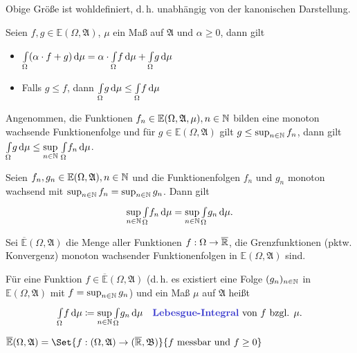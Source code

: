 \documentclass{cheat-sheet}
\newcommand{\Alg}{\mathfrak{A}} %
\newcommand{\Bor}{\mathfrak{B}} %
\newcommand{\E}{\mathbb{E}} %
\theoremstyle{definition}
\newcommand{\IntOmu}[1]{\Int{\Omega}{}{#1}{\mu}} %
\begin{document}
\begin{bem}
  Obige Größe ist wohldefiniert, d.\,h. unabhängig von der kanonischen Darstellung.
\end{bem}

\begin{satz}
  Seien $f, g \in \E(\Omega, \Alg)$, $\mu$ ein Maß auf $\Alg$ und $\alpha \geq 0$, dann gilt
  \begin{itemize}
    \item $\IntOmu{(\alpha \cdot f + g)} = \alpha \cdot \IntOmu{f} + \IntOmu{g}$ 
    \item Falls $g \leq f$, dann $\IntOmu{g} \leq \IntOmu{f}$ 
  \end{itemize}
\end{satz}

\begin{satz}
  Angenommen, die Funktionen $f_n \in \E(\Omega, \Alg, \mu), n \in \N$ bilden eine monoton wachsende Funktionenfolge und für $g \in \E(\Omega, \Alg)$ gilt $g \leq \sup_{n \in \mathbb{N}} f_n$, dann gilt $\textstyle \IntOmu{g} \leq \sup\limits_{n \in \N} \, \IntOmu{f_n}$.
\end{satz}

\begin{kor}
  Seien $f_n, g_n \in \E(\Omega, \Alg), n \in \N$ und die Funktionenfolgen $f_n$ und $g_n$ monoton wachsend mit $\sup_{n \in \mathbb{N}} f_n = \sup_{n \in \mathbb{N}} g_n$. Dann gilt
  \[ \sup_{n \in \N} \IntOmu{f_n} = \sup_{n \in \N} \IntOmu{g_n}. \]
\end{kor}

\begin{defn}
  Sei $\overline{\E}(\Omega, \Alg)$ die Menge aller Funktionen $f : \Omega \to \overline{\mathbb{R}}$, die Grenzfunktionen (pktw. Konvergenz) monoton wachsender Funktionenfolgen in $\E(\Omega, \Alg)$ sind.
\end{defn}

\begin{defn}
  Für eine Funktion $f \in \overline{\E}(\Omega, \Alg)$ (d.\,h. es existiert eine Folge $(g_n)_{n \in \mathbb{N}}$ in $\E(\Omega, \Alg)$ mit $f = \sup_{n \in \mathbb{N}} g_n$) und ein Maß $\mu$ auf $\Alg$ heißt
  \[ \IntOmu{f} \coloneqq \sup_{n \in \N} \IntOmu{g_n} \quad \text{\emph{Lebesgue-Integral} von $f$ bzgl. $\mu$.} \]
\end{defn}

\begin{satz}
  $\overline{\E}(\Omega, \Alg) = \Set{ f : (\Omega, \Alg) \to (\ER, \Bor) }{ f \text{ messbar und } f \geq 0 }$
\end{satz}
\end{document}
